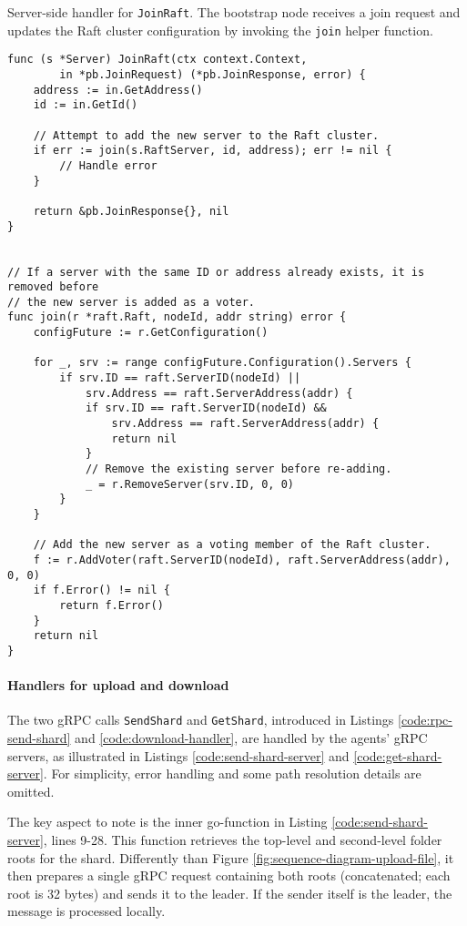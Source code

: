 \begin{listing}[H]
\caption{Server-side handler for \texttt{JoinRaft}. The bootstrap node receives a join request and updates the Raft cluster configuration by invoking the \texttt{join} helper function.}
\label{code:grpc-response-join-request}
\begin{verbatim}
func (s *Server) JoinRaft(ctx context.Context,
        in *pb.JoinRequest) (*pb.JoinResponse, error) {
    address := in.GetAddress()
    id := in.GetId()

    // Attempt to add the new server to the Raft cluster.
    if err := join(s.RaftServer, id, address); err != nil {
        // Handle error
    }

    return &pb.JoinResponse{}, nil
}


// If a server with the same ID or address already exists, it is removed before
// the new server is added as a voter.
func join(r *raft.Raft, nodeId, addr string) error {
    configFuture := r.GetConfiguration()

    for _, srv := range configFuture.Configuration().Servers {
        if srv.ID == raft.ServerID(nodeId) ||
            srv.Address == raft.ServerAddress(addr) {
            if srv.ID == raft.ServerID(nodeId) &&
                srv.Address == raft.ServerAddress(addr) {
                return nil
            }
            // Remove the existing server before re-adding.
            _ = r.RemoveServer(srv.ID, 0, 0)
        }
    }

    // Add the new server as a voting member of the Raft cluster.
    f := r.AddVoter(raft.ServerID(nodeId), raft.ServerAddress(addr), 0, 0)
    if f.Error() != nil {
        return f.Error()
    }
    return nil
}
\end{verbatim}
\end{listing}
\paragraph{Handlers for 
upload and download}

The two gRPC calls \texttt{SendShard} and \texttt{GetShard}, introduced in Listings \ref{code:rpc-send-shard} and \ref{code:download-handler}, are handled by the agents’ gRPC servers, as illustrated in Listings \ref{code:send-shard-server} and \ref{code:get-shard-server}. For simplicity, error handling and some path resolution details are omitted.

The key aspect to note is the inner go-function in Listing \ref{code:send-shard-server}, lines 9-28. This function retrieves the top-level and second-level folder roots for the shard. Differently than Figure \ref{fig:sequence-diagram-upload-file}, it then prepares a single gRPC request containing both roots (concatenated; each root is 32 bytes) and sends it to the leader. If the sender itself is the leader, the message is processed locally.

